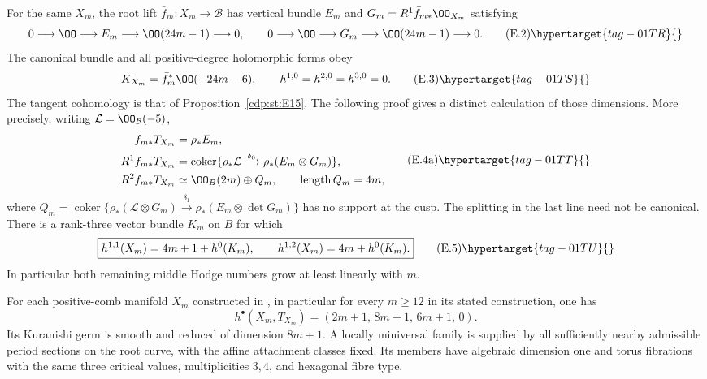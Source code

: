 
\begin{proposition}\hypertarget{tag-01SV}{}\label{inv:E2.2}


For the same $X_m$, the root lift $\bar f_m:X_m\to\mathcal B$ has
vertical bundle $E_m$ and $G_m=R^1\bar f_{m*}\OO_{X_m}$ satisfying
\[
 0\longrightarrow\OO\longrightarrow E_m
       \longrightarrow\OO(24m-1)\longrightarrow0,
 \qquad
 0\longrightarrow\OO\longrightarrow G_m
       \longrightarrow\OO(24m-1)\longrightarrow0.      \tag{E.2}\hypertarget{tag-01TR}{}\label{invII:eq:E.2}
\]
The canonical bundle and all positive-degree holomorphic forms obey
\[
 K_{X_m}=\bar f_m^*\OO(-24m-6),\qquad
 h^{1,0}=h^{2,0}=h^{3,0}=0.                            \tag{E.3}\hypertarget{tag-01TS}{}\label{invII:eq:E.3}
\]
The tangent cohomology is that of Proposition~\ref{cdp:st:E15}.
The following proof gives a distinct calculation of those dimensions.
More precisely, writing $\mathcal L=\OO_{\mathcal B}(-5)$,
\[
 \begin{split}
 f_{m*}T_{X_m}&=\rho_*E_m,\\
 R^1f_{m*}T_{X_m}&=
  \operatorname{coker}\{\rho_*\mathcal L\xrightarrow{\delta_0}
                                      \rho_*(E_m\otimes G_m)\},\\
 R^2f_{m*}T_{X_m}&\simeq\OO_B(2m)\oplus Q_m,
 \qquad\operatorname{length}Q_m=4m,
 \end{split}                                        \tag{E.4a}\hypertarget{tag-01TT}{}\label{invII:eq:E.4a}
\]
where $Q_m=\operatorname{coker}\{\rho_*(\mathcal L\otimes G_m)
\xrightarrow{\delta_1}\rho_*(E_m\otimes\det G_m)\}$ has no support
at the cusp. The splitting in the last line need not be canonical.
There is a rank-three vector bundle $K_m$ on $B$ for which
\[
 \boxed{h^{1,1}(X_m)=4m+1+h^0(K_m),\qquad
 h^{1,2}(X_m)=4m+h^0(K_m).}                            \tag{E.5}\hypertarget{tag-01TU}{}\label{invII:eq:E.5}
\]
In particular both remaining middle Hodge numbers grow at least
linearly with $m$.
\end{proposition}

\begin{proposition}\hypertarget{tag-01GM}{}\label{cdp:st:E15}


For each positive-comb manifold $X_m$ constructed in
\cite{Viaclovsky2026Combs}, in particular for every $m\geq12$ in
its stated construction, one has
\[
 h^\bullet(X_m,T_{X_m})=(2m+1,\,8m+1,\,6m+1,\,0).
\]
Its Kuranishi germ is smooth and reduced of dimension $8m+1$.
A locally miniversal family is supplied by all sufficiently nearby
admissible period sections on the root curve, with the affine
attachment classes fixed. Its members have algebraic dimension one
and torus fibrations with the same three critical values,
multiplicities $3,4$, and hexagonal fibre type.
\end{proposition}

